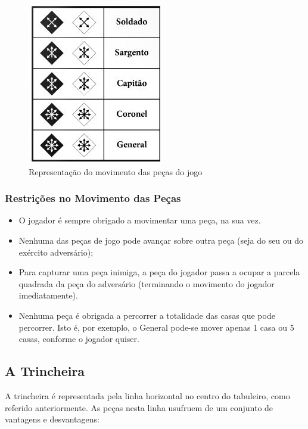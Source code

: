 \begin{figure}[h!]
\begin{center}
\includegraphics[scale=0.5]{img/pieces-movement.jpg}
\caption{Representação do movimento das peças do jogo}
\label{fig:5}
\end{center}
\end{figure}

\subsubsection{Restrições no Movimento das Peças}

\begin{itemize}
  \item O jogador é sempre obrigado a movimentar uma peça, na sua vez.
  \item Nenhuma das peças de jogo pode avançar sobre outra peça (seja do seu ou do exército adversário);
  \item Para capturar uma peça inimiga, a peça do jogador passa a ocupar a parcela quadrada da peça do adversário (terminando o movimento do jogador imediatamente).
  \item Nenhuma peça é obrigada a percorrer a totalidade das casas que pode percorrer. Isto é, por exemplo, o General pode-se mover apenas 1 casa ou 5 casas, conforme o jogador quiser.
\end{itemize}

\newpage

\subsection{A Trincheira}

A trincheira é representada pela linha horizontal no centro do tabuleiro, como referido anteriormente.
As peças nesta linha usufruem de um conjunto de vantagens e desvantagens:

